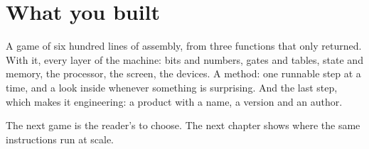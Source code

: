 \section{What you built}

A game of six hundred lines of assembly, from three functions that only
returned. With it, every layer of the machine: bits and numbers, gates and
tables, state and memory, the processor, the screen, the devices. A method:
one runnable step at a time, and a look inside whenever something is
surprising. And the last step, which makes it engineering: a product with a
name, a version and an author.

The next game is the reader's to choose. The next chapter shows where the
same instructions run at scale.
